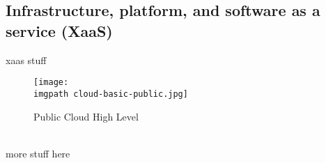 \newcommand{\imgpath}{cloud/a1a-design/img/}

\subsection{Infrastructure, platform, and software as a service (XaaS)}
xaas stuff
\\
\begin{figure}[h]
\centering
\texttt{[image: \\imgpath cloud-basic-public.jpg]}
\caption{Public Cloud High Level}
\label{fig:public-cloud-high-level}
\end{figure}
\\
more stuff here
